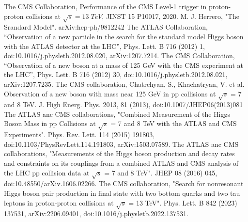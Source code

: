 \begin{thebibliography}{1}


The CMS Collaboration, Performance of the CMS Level-1 trigger in proton-proton collisions at $\sqrt{s}=13\;TeV$, JINST 15 P10017, 2020.
M. J. Herrero, "The Srandard Model". arXiv:hep-ph/9812242
The ATLAS Collaboration, “Observation of a new particle in the search for the standard model Higgs boson with the ATLAS detector at the LHC”, Phys. Lett. B 716 (2012) 1, doi:10.1016/j.physletb.2012.08.020, arXiv:1207.7214.
The CMS Collaboration, “Observation of a new boson at a mass of 125 GeV with the CMS experiment at the LHC”, Phys. Lett. B 716 (2012) 30, doi:10.1016/j.physletb.2012.08.021, arXiv:1207.7235.
The CMS collaboration, Chatrchyan, S., Khachatryan, V. et al. Observation of a new boson with mass near 125 GeV in pp collisions at $\sqrt{s}$ = 7 and 8 TeV. J. High Energ. Phys. 2013, 81 (2013), doi:10.1007/JHEP06(2013)081
The ATLAS anc CMS collaborations, "Combined Measurement of the Higgs Boson Mass in pp Collisions at $\sqrt{s}$ = 7 and 8 TeV with the ATLAS and CMS Experiments". Phys. Rev. Lett. 114 (2015) 191803, doi:10.1103/PhysRevLett.114.191803, arXiv:1503.07589.
The ATLAS anc CMS collaborations, "Measurements of the Higgs boson production and decay rates and constraints on its couplings from a combined ATLAS and CMS analysis of the LHC pp collision data at $\sqrt{s}$ = 7 and 8 TeV". JHEP 08 (2016) 045, 
doi:10.48550/arXiv.1606.02266.
The CMS collaboration, "Search for nonresonant Higgs boson pair production in final state with two bottom quarks and two tau leptons in proton-proton collisions at $\sqrt{s}$ = 13 TeV". Phys. Lett. B 842 (2023) 137531, arXiv:2206.09401, 
doi:10.1016/j.physletb.2022.137531.

\end{thebibliography}